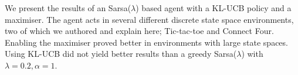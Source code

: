 We present the results of an Sarsa($\lambda$) based agent with a KL-UCB policy
and a maximiser. The agent acts in several different discrete state space
environments, two of which we authored and explain here; Tic-tac-toe and Connect
Four. Enabling the maximiser proved better in environments with large state
spaces. Using KL-UCB did not yield better results than a greedy Sarsa($\lambda$)
with $\lambda = 0.2, \alpha = 1$.
